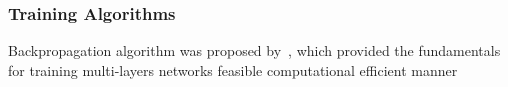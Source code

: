 \subsubsection{Training Algorithms}
Backpropagation algorithm was proposed by~\citet{werbos1975beyond}, which provided the fundamentals for training multi-layers networks feasible computational efficient manner